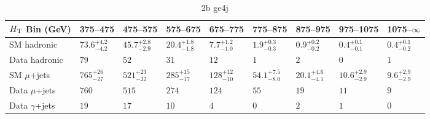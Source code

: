 \documentclass[8pt]{article}
\def\scalht{\mbox{$H_{\rm{T}}$}\xspace}
\newcommand\T{\rule{0pt}{2.6ex}}
\newcommand\B{\rule[-1.2ex]{0pt}{0pt}}
\begin{document}
\begin{table}[ht!]
\caption{2b ge4j}
\label{tab:ensemble-2b ge4j}
\centering
\begin{tabular}{ lllllllll }

\hline
\scalht Bin (GeV)       & 375--475                       & 475--575                       & 575--675                       & 675--775                       & 775--875                       & 875--975                       & 975--1075                      & 1075--$\infty$                 \\ [1.000000ex]
\hline
SM hadronic\T           & $73.6^{+4.2}_{-4.2}$           & $45.7^{+2.8}_{-2.9}$           & $20.4^{+1.8}_{-1.8}$           & $7.7^{+1.2}_{-1.0}$            & $1.9^{+0.3}_{-0.3}$            & $0.9^{+0.2}_{-0.2}$            & $0.4^{+0.1}_{-0.1}$            & $0.4^{+0.1}_{-0.2}$            \\ 
Data hadronic\B         & $79$                           & $52$                           & $31$                           & $12$                           & $1$                            & $2$                            & $0$                            & $1$                            \\ 
\hline
SM $\mu$+jets\T         & $765^{+26}_{-27}$              & $521^{+23}_{-22}$              & $285^{+15}_{-17}$              & $128^{+12}_{-10}$              & $54.1^{+7.5}_{-8.0}$           & $20.1^{+4.6}_{-4.1}$           & $10.6^{+2.9}_{-2.9}$           & $9.6^{+2.9}_{-2.9}$            \\ 
Data $\mu$+jets\B       & $760$                          & $515$                          & $274$                          & $124$                          & $55$                           & $19$                           & $11$                           & $9$                            \\ 
\hline
Data $\gamma$+jets\B    & $19$                           & $17$                           & $10$                           & $4$                            & $0$                            & $2$                            & $1$                            & $0$                            \\ 
\hline

\end{tabular}
\end{table}
\end{document}
